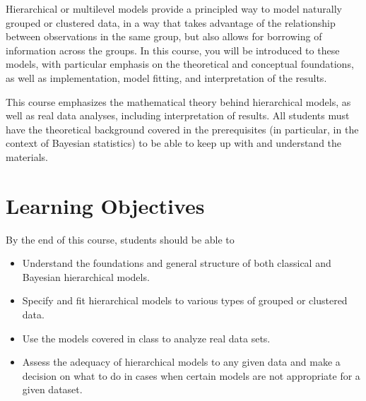 \documentclass[11pt, a4paper]{article}
\begin{document}
Hierarchical or multilevel models provide a principled way to model naturally grouped or clustered data, in a way that takes advantage of the relationship between observations in the same group, but also allows for borrowing of information across the groups. In this course, you will be introduced to these models, with particular emphasis on the theoretical and conceptual foundations, as well as implementation, model fitting, and interpretation of the results.

This course emphasizes the mathematical theory behind hierarchical models, as well as real data analyses, including interpretation of results. All students must have the theoretical background covered in the prerequisites (in particular, in the context of Bayesian statistics) to be able to keep up with and understand the materials. 


\section{Learning Objectives}
By the end of this course, students should be able to
\begin{itemize}[label= {\color{darkblue}{\ArrowBoldRightStrobe}}]
	\item Understand the foundations and general structure of both classical and Bayesian hierarchical models.
	\item Specify and fit hierarchical models to various types of grouped or clustered data.
	\item Use the models covered in class to analyze real data sets.
	\item Assess the adequacy of hierarchical models to any given data and make a decision on what to do in cases when certain models are not appropriate for a given dataset.
\end{itemize}


\end{document}
